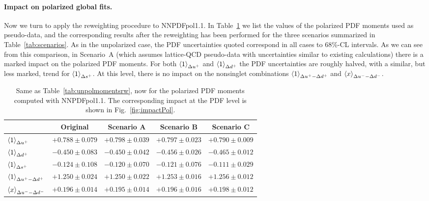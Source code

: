 \paragraph{Impact on polarized global fits.}
%
Now we turn to apply the reweighting procedure to NNPDFpol1.1.
%
In Table~\ref{tab:polmomentsrw}
we list the values of the polarized PDF moments
used as pseudo-data, and the corresponding results
after the reweighting has been performed for the
three scenarios summarized in Table~\ref{tab:scenarios}.
%
As in the unpolarized case, the PDF uncertainties quoted correspond in 
all cases to 68\%-CL intervals.
%
As we can see from this comparison, in Scenario~A
(which assumes lattice-QCD pseudo-data with uncertainties similar
to existing calculations) there is a marked impact on the
polarized PDF moments.
%
For both $\left\langle 1\right\rangle_{\Delta u^+}$ and $\left\langle 1\right\rangle_{\Delta d^+}$
the PDF uncertainties are roughly halved, with a similar, but less marked,
trend for $\left\langle 1\right\rangle_{\Delta s^+}$.
%
At this level, there is no impact on the nonsinglet
combinations $\left\langle 1\right\rangle_{\Delta u^+ - \Delta d^+}$
and $\left\langle x\right\rangle_{\Delta u^--\Delta d^-}$.

\begin{table}[!t]
\centering
\footnotesize
\renewcommand{\arraystretch}{1.4} 
\begin{tabular}{lcccc}
\toprule
& Original & Scenario A &  Scenario B & Scenario C \\
\midrule
$\left\langle 1\right\rangle_{\Delta u^+}$    
& $+0.788 \pm 0.079$   
& $+0.798 \pm 0.039$     
& $+0.797 \pm 0.023$ 
& $+0.790 \pm 0.009$ \\
$\left\langle 1\right\rangle_{\Delta d^+}$   
& $-0.450 \pm 0.083$  
& $-0.450 \pm 0.042$  
& $-0.456 \pm 0.026$    
& $-0.465 \pm 0.012$ \\
$\left\langle 1\right\rangle_{\Delta s^+}$    
& $-0.124 \pm 0.108$  
& $-0.120 \pm 0.070$  
& $-0.121 \pm 0.076$    
& $-0.111 \pm 0.029$ \\
$\left\langle 1\right\rangle_{\Delta u^+ - \Delta d^+}$  
& $+1.250 \pm 0.024$   
& $+1.250 \pm 0.022$  
& $+1.253 \pm 0.016$ 
& $+1.256 \pm 0.012$ \\
$\left\langle x\right\rangle_{\Delta u^--\Delta d^-}$     
& $+0.196 \pm 0.014$    
& $+0.195 \pm 0.014$
& $+0.196 \pm 0.016$     
& $+0.198 \pm 0.012$ \\
\bottomrule
\end{tabular}
\caption{\small Same as Table~\ref{tab:unpolmomentsrw}, now for
  the polarized PDF moments computed with NNPDFpol1.1.
  The corresponding impact at the PDF level is shown in
  Fig.~\ref{fig:impactPol}.
\label{tab:polmomentsrw}
}
\end{table}

